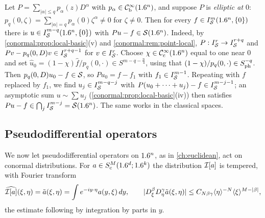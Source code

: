 \begin{example}\label{conormal:ex:elliptic-point}
  Let $P=\sum_{|\alpha|\le q}p_\alpha(z)D^\alpha$ with $p_\alpha\in\mathcal{C}^\infty_{\mathrm{b}}(1.6^n)$,
  and suppose $P$ is \emph{elliptic at $0$}: $p_q(0,\zeta)=\sum_{|\alpha|=q}
  p_\alpha(0)\zeta^\alpha\ne0$ for $\zeta\ne0$.  Then for every
  $f\in I^{m}_{\mathcal{S}}(1.6^n,\{0\})$ there is $u\in I^{m-q}_{\mathcal{S}}(1.6^n,\{0\})$ with
  $Pu-f\in\mathcal{S}(1.6^n)$.  Indeed, by \cref{conormal:prop:local-basic}(v) and
  \cref{conormal:rem:point-local}, $P:I^{r}_{\mathcal{S}}\to I^{r+q}_{\mathcal{S}}$ and
  $Pv-p_q(0,D)v\in I^{r+q-1}_{\mathcal{S}}$ for $v\in I^{r}_{\mathcal{S}}$.  Choose
  $\chi\in\mathcal{C}^\infty_{\mathrm{c}}(1.6^n)$ equal to one near $0$ and set
  $\hat u_0=(1-\chi)\hat f/p_q(0,\cdot)\in S^{m-q-\frac n4}$, using that
  $(1-\chi)/p_q(0,\cdot)\in S^{-q}_{\mathrm{ph}}$.  Then $p_q(0,D)u_0-f\in\mathcal{S}$, so
  $Pu_0=f-f_1$ with $f_1\in I^{m-1}_{\mathcal{S}}$.  Repeating with $f$ replaced by $f_1$,
  we find $u_j\in I^{m-q-j}_{\mathcal{S}}$ with $P(u_0+\dots+u_j)-f\in I^{m-j-1}_{\mathcal{S}}$;
  an asymptotic sum $u\sim\sum u_j$ (\cref{conormal:prop:local-basic}(iv)) then
  satisfies $Pu-f\in\bigcap_jI^{m-j}_{\mathcal{S}}=\mathcal{S}(1.6^n)$.  The same works in the
  classical spaces.
\end{example}

\subsection{Pseudodifferential operators}
We now let pseudodifferential operators on $1.6^n$, as in \cref{ch:euclidean},
act on conormal distributions.  For $a\in S^M_{\mathrm c}(1.6^d;1.6^k)$ the
distribution $\mathcal{I}[a]$ is tempered, with Fourier transform
\begin{equation}\label{conormal:eq:FT-osc}
  \widehat{\mathcal{I}[a]}(\xi,\eta)=\tilde a(\xi,\eta)=\int e^{-iy\cdot\eta}
  a(y,\xi)\,dy,\qquad
  |D_\xi^\beta D_\eta^\gamma\tilde a(\xi,\eta)|\le
  C_{N\beta\gamma}\langle \eta\rangle^{-N}\langle \xi\rangle^{M-|\beta|},
\end{equation}
the estimate following by integration by parts in $y$.

